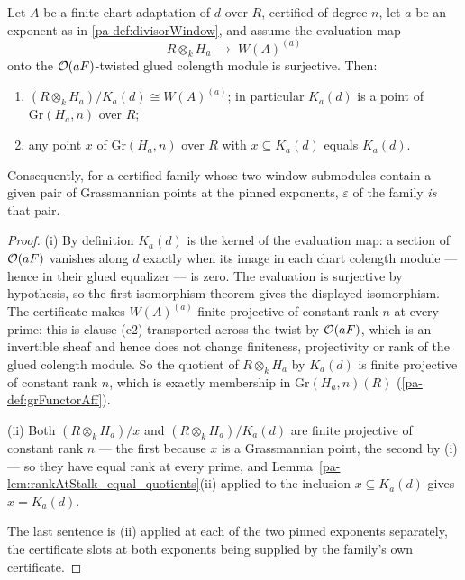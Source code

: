 \begin{theorem}
  \label{pa-thm:divisorWindow_eq_of_le}
  \leanok

  Let \(A\) be a finite chart adaptation of \(d\) over \(R\), certified of degree \(n\), let
  \(a\) be an exponent as in \ref{pa-def:divisorWindow}, and assume the evaluation map
  \[
    R \otimes_k H_a \;\longrightarrow\; W(A)^{(a)}
  \]
  onto the \(\mathcal{O}(aF)\)-twisted glued colength module is surjective. Then:
  \begin{enumerate}
    \item \((R \otimes_k H_a)/K_a(d) \cong W(A)^{(a)}\); in particular \(K_a(d)\) is a point
      of \(\mathrm{Gr}(H_a, n)\) over \(R\);
    \item any point \(x\) of \(\mathrm{Gr}(H_a, n)\) over \(R\) with \(x \subseteq K_a(d)\)
      equals \(K_a(d)\).
  \end{enumerate}
  Consequently, for a certified family whose two window submodules contain a given pair of
  Grassmannian points at the pinned exponents, \(\varepsilon\) of the family \emph{is} that
  pair.
\end{theorem}
\begin{proof}
  \leanok
  (i) By definition \(K_a(d)\) is the kernel of the evaluation map: a section of
  \(\mathcal{O}(aF)\) vanishes along \(d\) exactly when its image in each chart colength module ---
  hence in their glued equalizer --- is zero. The evaluation is surjective by hypothesis,
  so the first isomorphism theorem gives the displayed isomorphism. The certificate makes
  \(W(A)^{(a)}\) finite projective of constant rank \(n\) at every prime: this is clause
  (c2) transported across the twist by \(\mathcal{O}(aF)\), which is an invertible sheaf and hence
  does not change finiteness, projectivity or rank of the glued colength module. So the
  quotient of \(R \otimes_k H_a\) by \(K_a(d)\) is finite projective of constant rank
  \(n\), which is exactly membership in \(\mathrm{Gr}(H_a, n)(R)\)
  (\ref{pa-def:grFunctorAff}).

  (ii) Both \((R\otimes_k H_a)/x\) and \((R \otimes_k H_a)/K_a(d)\) are finite projective of
  constant rank \(n\) --- the first because \(x\) is a Grassmannian point, the second by
  (i) --- so they have equal rank at every prime, and
  Lemma~\ref{pa-lem:rankAtStalk_equal_quotients}(ii) applied to the inclusion
  \(x \subseteq K_a(d)\) gives \(x = K_a(d)\).

  The last sentence is (ii) applied at each of the two pinned exponents separately, the
  certificate slots at both exponents being supplied by the family's own certificate.
\end{proof}

